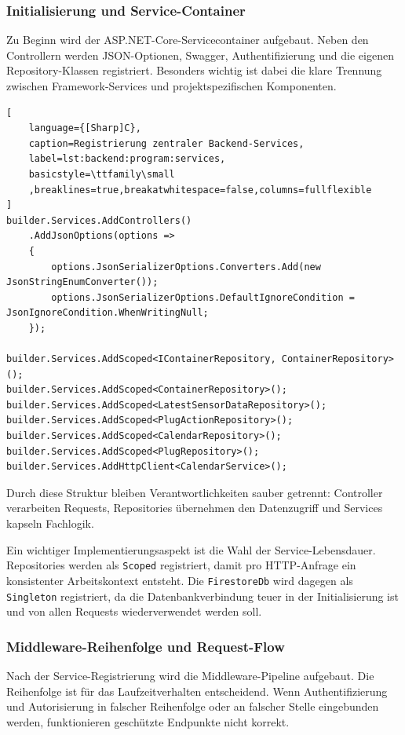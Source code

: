 \subsubsection{Initialisierung und Service-Container}

Zu Beginn wird der ASP.NET-Core-Servicecontainer aufgebaut. Neben den Controllern werden JSON-Optionen, Swagger, Authentifizierung und die eigenen Repository-Klassen registriert. Besonders wichtig ist dabei die klare Trennung zwischen Framework-Services und projektspezifischen Komponenten.

\begin{lstlisting}[
    language={[Sharp]C},
    caption=Registrierung zentraler Backend-Services,
    label=lst:backend:program:services,
    basicstyle=\ttfamily\small
    ,breaklines=true,breakatwhitespace=false,columns=fullflexible
]
builder.Services.AddControllers()
    .AddJsonOptions(options =>
    {
        options.JsonSerializerOptions.Converters.Add(new JsonStringEnumConverter());
        options.JsonSerializerOptions.DefaultIgnoreCondition = JsonIgnoreCondition.WhenWritingNull;
    });

builder.Services.AddScoped<IContainerRepository, ContainerRepository>();
builder.Services.AddScoped<ContainerRepository>();
builder.Services.AddScoped<LatestSensorDataRepository>();
builder.Services.AddScoped<PlugActionRepository>();
builder.Services.AddScoped<CalendarRepository>();
builder.Services.AddScoped<PlugRepository>();
builder.Services.AddHttpClient<CalendarService>();
\end{lstlisting}

Durch diese Struktur bleiben Verantwortlichkeiten sauber getrennt: Controller verarbeiten Requests, Repositories übernehmen den Datenzugriff und Services kapseln Fachlogik.

Ein wichtiger Implementierungsaspekt ist die Wahl der Service-Lebensdauer. Repositories werden als \texttt{Scoped} registriert, damit pro HTTP-Anfrage ein konsistenter Arbeitskontext entsteht. Die \texttt{FirestoreDb} wird dagegen als \texttt{Singleton} registriert, da die Datenbankverbindung teuer in der Initialisierung ist und von allen Requests wiederverwendet werden soll.

\subsubsection{Middleware-Reihenfolge und Request-Flow}

Nach der Service-Registrierung wird die Middleware-Pipeline aufgebaut. Die Reihenfolge ist für das Laufzeitverhalten entscheidend. Wenn Authentifizierung und Autorisierung in falscher Reihenfolge oder an falscher Stelle eingebunden werden, funktionieren geschützte Endpunkte nicht korrekt.

